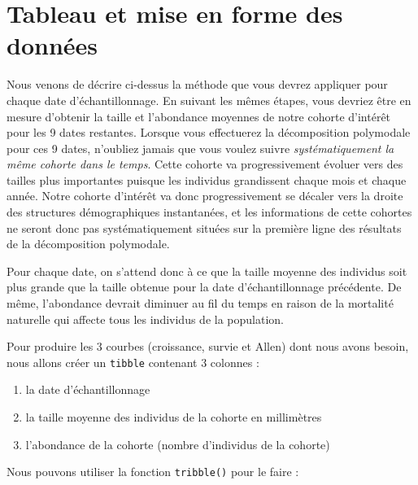 \documentclass[
  a4paper,
  DIV=11,
  numbers=noendperiod,
  oneside]{scrreprt}
\newenvironment{Shaded}{}{}
\newcommand{\DecValTok}[1]{\textcolor[rgb]{0.00,0.36,0.77}{#1}}
\newcommand{\FunctionTok}[1]{\textcolor[rgb]{0.44,0.26,0.76}{#1}}
\newcommand{\NormalTok}[1]{\textcolor[rgb]{0.14,0.16,0.18}{#1}}
\newcommand{\OtherTok}[1]{\textcolor[rgb]{0.44,0.26,0.76}{#1}}
\newcommand{\SpecialCharTok}[1]{\textcolor[rgb]{0.00,0.36,0.77}{#1}}
\newcommand{\StringTok}[1]{\textcolor[rgb]{0.01,0.18,0.38}{#1}}
\providecommand{\tightlist}{%
  \setlength{\itemsep}{0pt}\setlength{\parskip}{0pt}}\usepackage{longtable,booktabs,array}
\begin{document}
\hypertarget{tableau-et-mise-en-forme-des-donnuxe9es}{%
\section{Tableau et mise en forme des
données}\label{tableau-et-mise-en-forme-des-donnuxe9es}}

Nous venons de décrire ci-dessus la méthode que vous devrez appliquer
pour chaque date d'échantillonnage. En suivant les mêmes étapes, vous
devriez être en mesure d'obtenir la taille et l'abondance moyennes de
notre cohorte d'intérêt pour les 9 dates restantes. Lorsque vous
effectuerez la décomposition polymodale pour ces 9 dates, n'oubliez
jamais que vous voulez suivre \emph{systématiquement la même cohorte
dans le temps}. Cette cohorte va progressivement évoluer vers des
tailles plus importantes puisque les individus grandissent chaque mois
et chaque année. Notre cohorte d'intérêt va donc progressivement se
décaler vers la droite des structures démographiques instantanées, et
les informations de cette cohortes ne seront donc pas systématiquement
situées sur la première ligne des résultats de la décomposition
polymodale.

Pour chaque date, on s'attend donc à ce que la taille moyenne des
individus soit plus grande que la taille obtenue pour la date
d'échantillonnage précédente. De même, l'abondance devrait diminuer au
fil du temps en raison de la mortalité naturelle qui affecte tous les
individus de la population.

Pour produire les 3 courbes (croissance, survie et Allen) dont nous
avons besoin, nous allons créer un \texttt{tibble} contenant 3 colonnes
:

\begin{enumerate}
\def\labelenumi{\arabic{enumi}.}
\tightlist
\item
  la date d'échantillonnage
\item
  la taille moyenne des individus de la cohorte en millimètres
\item
  l'abondance de la cohorte (nombre d'individus de la cohorte)
\end{enumerate}

Nous pouvons utiliser la fonction \texttt{tribble()} pour le faire :

\begin{figure}

\begin{Shaded}
\end{Shaded}

\end{figure}
\end{document}
